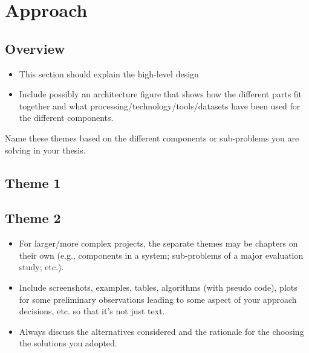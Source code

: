\chapter{Approach}
\label{ch:approach}


\section{Overview}
\begin{itemize}
    \item This section should explain the high-level design
    \item Include possibly an architecture figure that shows how the different parts fit together and what processing/technology/tools/datasets have been used for the different components.
\end{itemize}
    
    Name these themes based on the different components or sub-problems you are solving in your thesis.
    
    \section{Theme 1}
    \section{Theme 2}
    
    \begin{itemize}
    \item For larger/more complex projects, the separate themes may be chapters on their own (e.g., components in a system; sub-problems of a major evaluation study; etc.).
    \item Include screenshots, examples, tables, algorithms (with pseudo code), plots for some preliminary observations leading to some aspect of your approach decisions, etc. so that it's not just text.
    \item Always discuss the alternatives considered and the rationale for the choosing the solutions you adopted.
\end{itemize}
    